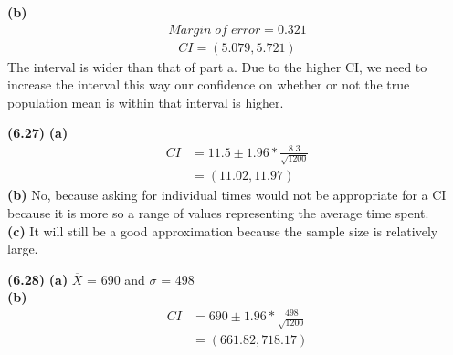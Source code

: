 \documentclass[11pt]{article}
\renewcommand\part[1]{\vspace{.10in}\textbf{(#1)}}
\begin{document}
		\part{b}
			\begin{align*}
				Margin\; of\; error = 0.321
			\end{align*}
			\begin{align*}
				CI = (5.079, 5.721)
			\end{align*}
			The interval is wider than that of part a. Due to the higher CI, we need to increase the interval this way our confidence on whether or not the true population mean is within that interval is higher.\par
			
	\part{6.27}
		\part{a}
			\begin{align*}
				CI &= 11.5 \pm 1.96 * \frac{8.3}{\sqrt{1200}}\\
				&= (11.02, 11.97)
			\end{align*}
		\part{b}
			No, because asking for individual times would not be appropriate for a CI because it is more so a range of values representing the average time spent.\\
		\part{c}
			It will still be a good approximation because the sample size is relatively large.\par
	
	\part{6.28}
		\part{a}
			$\overline{X}$ =  690 and $\sigma$ = 498\\
		\part{b}
			\begin{align*}
				CI &= 690 \pm 1.96 * \frac{498}{\sqrt{1200}}\\
				&= (661.82, 718.17)
			\end{align*}
\end{document}
